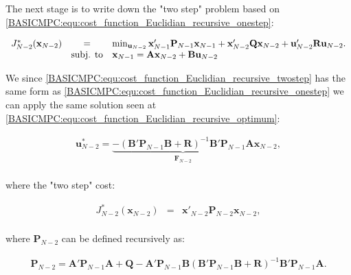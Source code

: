     The next stage is to write down the "two step" problem based on \ref{BASICMPC:equ:cost_function_Euclidian_recursive_onestep}:

    \begin{equation}
        \begin{array}{rcl}
         J^*_{N-2}(\textbf{x}_{N-2})&=&\min_{\textbf{u}_{N-2}}\textbf{x}'_{N-1}\textbf{P}_{N-1}\textbf{x}_{N-1}+\textbf{x}'_{N-2}\textbf{Q}\textbf{x}_{N-2}+\textbf{u}'_{N-2}\textbf{R}\textbf{u}_{N-2}.\\
          &\textnormal{subj. to}&\textbf{x}_{N-1}=\textbf{Ax}_{N-2}+\textbf{Bu}_{N-2}\\
        \end{array}
        \label{BASICMPC:equ:cost_function_Euclidian_recursive_twostep}
    \end{equation}

    We since \ref{BASICMPC:equ:cost_function_Euclidian_recursive_twostep} has the same form as \ref{BASICMPC:equ:cost_function_Euclidian_recursive_onestep} we can apply the same solution seen at \ref{BASICMPC:equ:cost_function_Euclidian_recursive_optimum}:

    \begin{equation}
        \begin{array}{rcl}
        \textbf{u}^*_{N-2}=\underbrace{-(\textbf{B}'\textbf{P}_{N-1}\textbf{B}+\textbf{R})^{-1}\textbf{B}'\textbf{P}_{N-1}\textbf{A}}_{\textbf{F}_{N-2}}\textbf{x}_{N-2},\\
        \end{array}
        \label{BASICMPC:equ:cost_function_Euclidian_recursive_optimum_twostep}
    \end{equation}

    where the "two step" cost:

    \begin{equation}
        \begin{array}{rcl}
        J^*_{N-2}(\textbf{x}_{N-2})&=&\textbf{x}'_{N-2}\textbf{P}_{N-2}\textbf{x}_{N-2},\\
        \end{array}
        \label{BASICMPC:equ:cost_function_Euclidian_recursive_twostepback}
    \end{equation}

    where $\textbf{P}_{N-2}$ can be defined recursively as:

    \begin{equation}
        \begin{array}{rcl}
        \textbf{P}_{N-2}=\textbf{A}'\textbf{P}_{N-1}\textbf{A}+\textbf{Q}-\textbf{A}'\textbf{P}_{N-1}\textbf{B}(\textbf{B}'\textbf{P}_{N-1}\textbf{B}+\textbf{R})^{-1}\textbf{B}'\textbf{P}_{N-1}\textbf{A}.\\
        \end{array}
        \label{BASICMPC:equ:cost_function_Euclidian_recursive_twoP}
    \end{equation}

